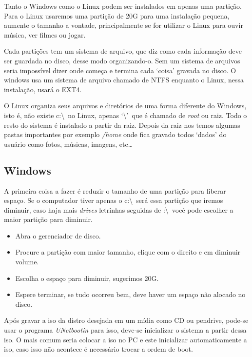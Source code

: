 \documentclass{handout_utfpr}
\begin{document}
Tanto o Windows como o Linux podem ser instalados em apenas uma partição. Para o Linux usaremos uma partição de 20G para uma instalação pequena, aumente o tamanho a vontade, principalmente se for utilizar o Linux para ouvir música, ver filmes ou jogar. 

Cada partições tem um sistema de arquivo, que diz como cada informação deve ser guardada no disco, desse modo organizando-o. Sem um sistema de arquivos seria impossível dizer onde começa e termina cada `coisa' gravada no disco. O windows usa um sistema de arquivo chamado de NTFS enquanto o Linux, nessa instalação, usará o EXT4.

O Linux organiza seus arquivos e diretórios de uma forma diferente do Windows, isto é, não existe c:\textbackslash\ no Linux, apenas `\textbackslash'\ que é chamado de \emph{root} ou raiz. Todo o resto do sistema é instalado a partir da raiz. Depois da raiz nos temos algumas pastas importantes por exemplo \emph{/home} onde fica gravado todos `dados' do usuário como fotos, músicas, imagens, etc\dots

\subsection{Windows}
A primeira coisa a fazer é reduzir o tamanho de uma partição para liberar espaço. Se o computador tiver apenas o c:\textbackslash\ será essa partição que iremos diminuir, caso haja mais \emph{drives} letrinhas seguidas de :\textbackslash\ você pode escolher a maior partição para diminuir.

\begin{itemize}
    \item Abra o gerenciador de disco.
    \item Procure a partição com maior tamanho, clique com o direito e em diminuir volume.
    \item Escolha o espaço para diminuir, sugerimos 20G.
    \item Espere terminar, se tudo ocorreu bem, deve haver um espaço não alocado no disco.
\end{itemize}

Após gravar a iso da distro desejada em um mídia como CD ou pendrive, pode-se usar o programa \emph{UNetbootin} para isso, deve-se inicializar o sistema a partir dessa iso. O mais comum seria colocar a iso no PC e este inicializar automaticamente a iso, caso isso não acontece é necessário trocar a ordem de boot.
\end{document}
